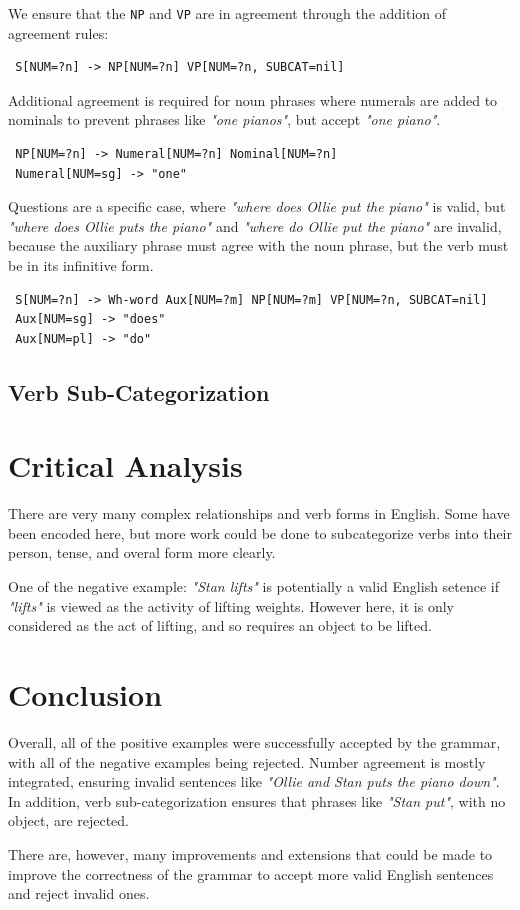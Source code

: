 \documentclass[12pt, a4paper]{article}
\begin{document}
We ensure that the \texttt{NP} and \texttt{VP} are in agreement through the addition of agreement rules:

\begin{lstlisting}
 S[NUM=?n] -> NP[NUM=?n] VP[NUM=?n, SUBCAT=nil]
\end{lstlisting}

Additional agreement is required for noun phrases where numerals are added to nominals to prevent phrases like \textit{"one pianos"}, but accept \textit{"one piano"}.

\begin{lstlisting}
 NP[NUM=?n] -> Numeral[NUM=?n] Nominal[NUM=?n]
 Numeral[NUM=sg] -> "one"
\end{lstlisting}

Questions are a specific case, where \textit{"where does Ollie put the piano"} is valid, but \textit{"where does Ollie puts the piano"} and \textit{"where do Ollie put the piano"} are invalid, because the auxiliary phrase must agree with the noun phrase, but the verb must be in its infinitive form.

\begin{lstlisting}
 S[NUM=?n] -> Wh-word Aux[NUM=?m] NP[NUM=?m] VP[NUM=?n, SUBCAT=nil]
 Aux[NUM=sg] -> "does" 
 Aux[NUM=pl] -> "do"
\end{lstlisting}

\subsection{Verb Sub-Categorization}


\section{Critical Analysis}

There are very many complex relationships and verb forms in English. Some have been encoded here, but more work could be done to subcategorize verbs into their person, tense, and overal form more clearly.

One of the negative example: \textit{"Stan lifts"} is potentially a valid English setence if \textit{"lifts"} is viewed as the activity of lifting weights. However here, it is only considered as the act of lifting, and so requires an object to be lifted.

\section{Conclusion}

Overall, all of the positive examples were successfully accepted by the grammar, with all of the negative examples being rejected. Number agreement is mostly integrated, ensuring invalid sentences like \textit{"Ollie and Stan puts the piano down"}. In addition, verb sub-categorization ensures that phrases like \textit{"Stan put"}, with no object, are rejected.

There are, however, many improvements and extensions that could be made to improve the correctness of the grammar to accept more valid English sentences and reject invalid ones.
\end{document}
